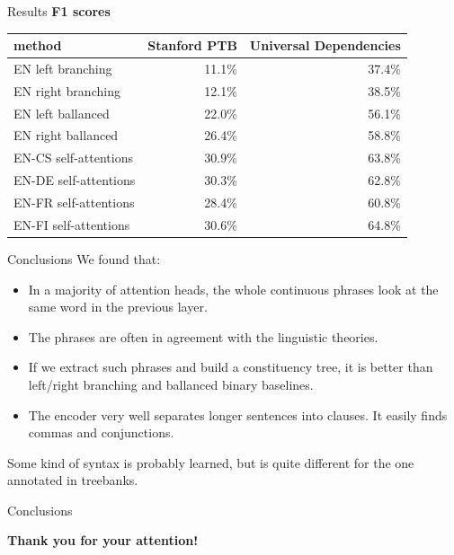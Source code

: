 \documentclass{beamer}
\begin{document}
 

\begin{frame}{Results}
\textbf{F1 scores}
\bigskip

\begin{centering}
\begin{tabular}{lrr}
method                 & Stanford PTB & Universal Dependencies \\
\hline
EN left branching      & 11.1\% & 37.4\%\\
EN right branching     & 12.1\% & 38.5\%\\
EN left ballanced      & 22.0\% & 56.1\%\\
EN right ballanced     & 26.4\% & 58.8\%\\
\hline
EN-CS self-attentions  & 30.9\% & 63.8\%\\
EN-DE self-attentions  & 30.3\% & 62.8\%\\
EN-FR self-attentions  & 28.4\% & 60.8\%\\
EN-FI self-attentions  & 30.6\% & 64.8\%\\
\end{tabular}
\end{centering}
\end{frame}

\begin{frame}{Conclusions}
We found that:
\begin{itemize}
    \item In a majority of attention heads, the whole continuous phrases look at the same word in the previous layer.
    \item The phrases are often in agreement with the linguistic theories.
    \item If we extract such phrases and build a constituency tree, it is better than left/right branching and ballanced binary baselines.
    \item The encoder very well separates longer sentences into clauses. It easily finds commas and conjunctions.
\end{itemize}
Some kind of syntax is probably learned, but is quite different for the one annotated in treebanks.
\end{frame}

\begin{frame}{Conclusions}
    \begin{center}
    \textbf{Thank you for your attention!}
    \end{center}
\end{frame}
\end{document}
